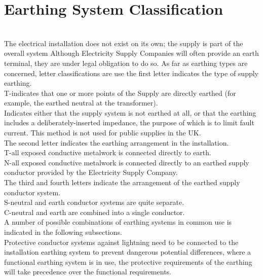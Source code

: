 \documentclass[12pt,fleqn]{book} %
\begin{document}
\section{Earthing System Classification}
\\ The electrical installation does not exist on its own; the supply is part of the overall system Although Electricity Supply Companies will often provide an earth terminal, they are under legal obligation to do so. As far as earthing types are concerned, letter classifications are use the first letter indicates the type of supply earthing.
\\ T-indicates that one or more points of the Supply are directly earthed (for example, the earthed neutral at the transformer).
\\ Indicates either that the supply system is not earthed at all, or that the earthing includes a deliberately-inserted impedance, the purpose of which is to limit fault current. This method is not used for public supplies in the UK.
\\ The second letter indicates the earthing arrangement in the installation.
\\ T-all exposed conductive metalwork is connected directly to earth.
\\ N-all exposed conductive metalwork is connected directly to an earthed supply conductor provided by the Electricity Supply Company.
\\The third and fourth letters indicate the arrangement of the earthed supply conductor system.
\\ S-neutral and earth conductor systems are quite separate.
\\ C-neutral and earth are combined into a single conductor.
\\ A number of possible combinations of earthing systems in common use is indicated in the following subsections.
\\ Protective conductor systems against lightning need to be connected to the installation earthing system to prevent dangerous potential differences, where a functional earthing system is in use, the protective requirements of the earthing will take precedence over the functional requirements.
\end{document}
